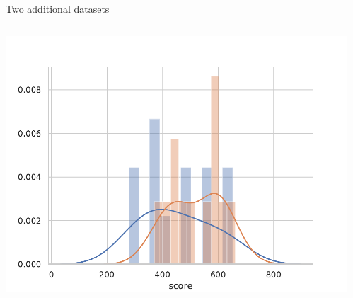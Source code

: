 \documentclass[compress]{beamer}
\begin{document}
\begin{frame}{Two additional datasets}
\begin{columns}
\begin{column}{0.45\linewidth}
            \includegraphics[width=\columnwidth]{code/distributions2.pdf}
        \end{column}
        \begin{column}{0.45\linewidth}


\end{column}
\end{columns}
\end{frame}
\end{document}
